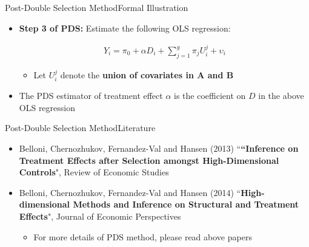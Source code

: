 \documentclass[hyperref={pdfpagelabels=false}]{beamer}
\begin{document}
\begin{frame}{Post-Double Selection Method}{Formal Illustration}
\begin{itemize}

\item \textbf{Step 3 of PDS:} Estimate the following OLS regression:

\begin{eqnarray*}
	Y_{i} = \pi_{0} +  \alpha D_{i} + \sum^{g}_{j=1} \pi_{j} U^{j}_{i}  + \upsilon_{i}
\end{eqnarray*}	




	

\begin{itemize}
\item Let $U^{j}_{i}$ denote the \textbf{union of covariates in A and B}
\end{itemize}
	\vspace{0.3cm}
\item The PDS estimator of treatment effect $\alpha$ is the coefficient on $D$ in the above OLS regression



\end{itemize}



\end{frame}







\begin{frame}{Post-Double Selection Method}{Literature}
	
	\begin{itemize}
		
		\item[] Belloni, Chernozhukov, Fernandez-Val and Hansen (2013) ``\textbf{``Inference on Treatment Effects after Selection amongst High-Dimensional Controls}", Review of Economic Studies  
		\vspace{0.2cm}
		\item[] Belloni, Chernozhukov, Fernandez-Val and Hansen (2014) ``\textbf{High-dimensional Methods and Inference on Structural and Treatment Effects}", Journal of Economic Perspectives
		
		\begin{itemize}
			\vspace{0.2cm}
			\item For more details of PDS method, please read above papers
		\end{itemize}
	\end{itemize}
\end{frame}
\end{document}
